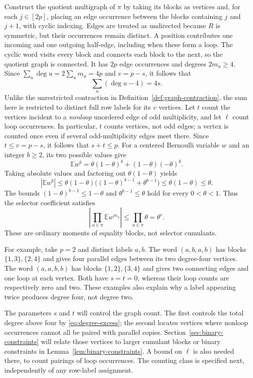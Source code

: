 \documentclass[11pt]{article}
\theoremstyle{definition}
\theoremstyle{remark}
\theoremstyle{plain}
\newcommand{\E}{\mathbb E}
\begin{document}
Construct the quotient multigraph of $\pi$ by taking its blocks as vertices
and, for each $j\in[2p]$, placing an edge occurrence between the
blocks containing $j$ and $j+1$, with cyclic indexing.
Edges are treated as undirected because $R$ is symmetric, but
their occurrences remain distinct. A position contributes one
incoming and one outgoing half-edge, including when these form a
loop. The cyclic word visits every block and connects each block to
the next, so the quotient graph is connected. It has \(2p\) edge
occurrences and degrees \(2m_u\ge4\). Since
$\sum_u\deg u=2\sum_u m_u=4p$ and $v=p-s$, it follows that
\begin{equation}\label{eq:degree-excess}
                         \sum_u(\deg u-4)=4s.
\end{equation}
Unlike the unrestricted contraction in
Definition~\ref{def:graph-contraction}, the sum here is restricted
to distinct full row labels for its \(v\) vertices.
Let \(t\) count the vertices incident to a
\emph{nonloop} unordered edge of odd multiplicity, and let \(\ell\)
count loop occurrences. In particular, $t$ counts vertices, not odd
edges; a vertex is counted once even if several odd-multiplicity
edges meet there. Since $t\le v=p-s$, it follows that \(s+t\le p\).
For a centered Bernoulli variable \(w\) and an integer \(b\ge2\),
its two possible values give
\[
 \E w^b=\theta(1-\theta)^b+(1-\theta)(-\theta)^b.
\]
Taking absolute values and factoring out $\theta(1-\theta)$ yields
\begin{equation}\label{eq:selector-moment}
 |\E w^b|
 \le\theta(1-\theta)\big((1-\theta)^{b-1}+\theta^{b-1}\big)
 \le\theta(1-\theta)\le\theta.
\end{equation}
The bounds $(1-\theta)^{b-1}\le1-\theta$ and
$\theta^{b-1}\le\theta$ hold for every $0<\theta<1$.
Thus the selector coefficient satisfies
\[
 \left|\prod_{u\in\pi}\E w^{m_u}\right|
 \le\prod_{u\in\pi}\theta=\theta^v.
\]
These are ordinary moments of equality blocks, not selector cumulants.

For example, take $p=2$ and distinct labels $a,b$. The word
$(a,b,a,b)$ has blocks $\{1,3\},\{2,4\}$ and gives four parallel
edges between its two degree-four vertices. The word $(a,a,b,b)$
has blocks $\{1,2\},\{3,4\}$ and gives two connecting edges and one
loop at each vertex. Both have $s=t=0$, whereas their loop counts
are respectively zero and two. These examples also explain why a
label appearing twice produces degree four, not degree two.

The parameters $s$ and $t$ will control the graph count. The first
controls the total degree above four by \eqref{eq:degree-excess};
the second locates vertices where nonloop occurrences cannot all be
paired with parallel copies. Section~\ref{sec:binary-constraints}
will relate those vertices to larger cumulant blocks or binary
constraints in Lemma~\ref{lem:binary-constraints}. A
bound on $\ell$ is also needed there, to count pairings
of loop occurrences. The counting class is specified next, independently
of any row-label assignment.
\end{document}

